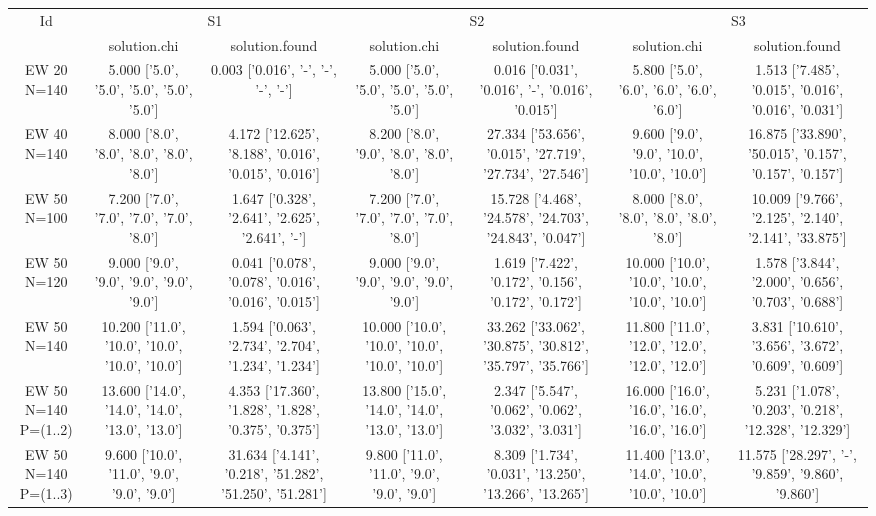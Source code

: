 \documentclass[landscape, 12pt]{report}
\begin{document}
\begin{tabular}{|c|cc|cc|cc|}
\hline
\multicolumn{1}{|c|}{Id} & \multicolumn{2}{|c|}{S1} & \multicolumn{2}{|c|}{S2} & \multicolumn{2}{|c|}{S3}
\\
 & solution.chi & solution.found & solution.chi & solution.found & solution.chi & solution.found
\\
\hline
EW 20 N=140 & 5.000 ['5.0', '5.0', '5.0', '5.0', '5.0'] & 0.003 ['0.016', '-', '-', '-', '-'] & 5.000 ['5.0', '5.0', '5.0', '5.0', '5.0'] & 0.016 ['0.031', '0.016', '-', '0.016', '0.015'] & 5.800 ['5.0', '6.0', '6.0', '6.0', '6.0'] & 1.513 ['7.485', '0.015', '0.016', '0.016', '0.031']
\\
EW 40 N=140 & 8.000 ['8.0', '8.0', '8.0', '8.0', '8.0'] & 4.172 ['12.625', '8.188', '0.016', '0.015', '0.016'] & 8.200 ['8.0', '9.0', '8.0', '8.0', '8.0'] & 27.334 ['53.656', '0.015', '27.719', '27.734', '27.546'] & 9.600 ['9.0', '9.0', '10.0', '10.0', '10.0'] & 16.875 ['33.890', '50.015', '0.157', '0.157', '0.157']
\\
EW 50 N=100 & 7.200 ['7.0', '7.0', '7.0', '7.0', '8.0'] & 1.647 ['0.328', '2.641', '2.625', '2.641', '-'] & 7.200 ['7.0', '7.0', '7.0', '7.0', '8.0'] & 15.728 ['4.468', '24.578', '24.703', '24.843', '0.047'] & 8.000 ['8.0', '8.0', '8.0', '8.0', '8.0'] & 10.009 ['9.766', '2.125', '2.140', '2.141', '33.875']
\\
EW 50 N=120 & 9.000 ['9.0', '9.0', '9.0', '9.0', '9.0'] & 0.041 ['0.078', '0.078', '0.016', '0.016', '0.015'] & 9.000 ['9.0', '9.0', '9.0', '9.0', '9.0'] & 1.619 ['7.422', '0.172', '0.156', '0.172', '0.172'] & 10.000 ['10.0', '10.0', '10.0', '10.0', '10.0'] & 1.578 ['3.844', '2.000', '0.656', '0.703', '0.688']
\\
EW 50 N=140 & 10.200 ['11.0', '10.0', '10.0', '10.0', '10.0'] & 1.594 ['0.063', '2.734', '2.704', '1.234', '1.234'] & 10.000 ['10.0', '10.0', '10.0', '10.0', '10.0'] & 33.262 ['33.062', '30.875', '30.812', '35.797', '35.766'] & 11.800 ['11.0', '12.0', '12.0', '12.0', '12.0'] & 3.831 ['10.610', '3.656', '3.672', '0.609', '0.609']
\\
EW 50 N=140 P=(1..2) & 13.600 ['14.0', '14.0', '14.0', '13.0', '13.0'] & 4.353 ['17.360', '1.828', '1.828', '0.375', '0.375'] & 13.800 ['15.0', '14.0', '14.0', '13.0', '13.0'] & 2.347 ['5.547', '0.062', '0.062', '3.032', '3.031'] & 16.000 ['16.0', '16.0', '16.0', '16.0', '16.0'] & 5.231 ['1.078', '0.203', '0.218', '12.328', '12.329']
\\
EW 50 N=140 P=(1..3) & 9.600 ['10.0', '11.0', '9.0', '9.0', '9.0'] & 31.634 ['4.141', '0.218', '51.282', '51.250', '51.281'] & 9.800 ['11.0', '11.0', '9.0', '9.0', '9.0'] & 8.309 ['1.734', '0.031', '13.250', '13.266', '13.265'] & 11.400 ['13.0', '14.0', '10.0', '10.0', '10.0'] & 11.575 ['28.297', '-', '9.859', '9.860', '9.860']

\end{tabular}
\end{document}
